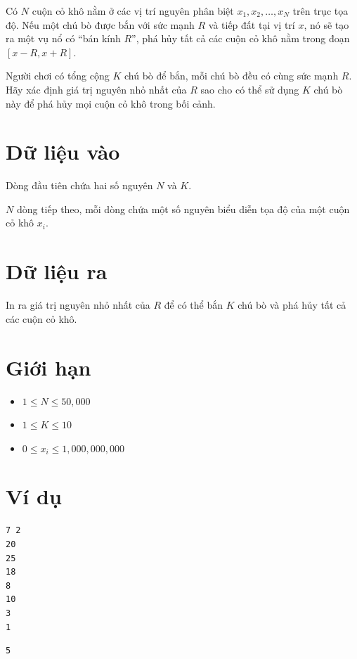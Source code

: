 \documentclass[12pt,a4paper]{article}
\begin{document}
Có $N$ cuộn cỏ khô nằm ở các vị trí nguyên phân biệt $x_1, x_2, \dots, x_N$ trên trục tọa độ. Nếu một chú bò được bắn với sức mạnh $R$ và tiếp đất tại vị trí $x$, nó sẽ tạo ra một vụ nổ có ``bán kính $R$'', phá hủy tất cả các cuộn cỏ khô nằm trong đoạn $[x-R, x+R]$.

Người chơi có tổng cộng $K$ chú bò để bắn, mỗi chú bò đều có cùng sức mạnh $R$. Hãy xác định giá trị nguyên nhỏ nhất của $R$ sao cho có thể sử dụng $K$ chú bò này để phá hủy mọi cuộn cỏ khô trong bối cảnh.

\section*{Dữ liệu vào}
Dòng đầu tiên chứa hai số nguyên $N$ và $K$.

$N$ dòng tiếp theo, mỗi dòng chứa một số nguyên biểu diễn tọa độ của một cuộn cỏ khô $x_i$.

\section*{Dữ liệu ra}
In ra giá trị nguyên nhỏ nhất của $R$ để có thể bắn $K$ chú bò và phá hủy tất cả các cuộn cỏ khô.

\section*{Giới hạn}
\begin{constraintbox}
\begin{itemize}
    \item $1 \le N \le 50,000$
    \item $1 \le K \le 10$
    \item $0 \le x_i \le 1,000,000,000$
\end{itemize}
\end{constraintbox}

\section*{Ví dụ}
\begin{inputbox}
\begin{lstlisting}
7 2
20
25
18
8
10
3
1
\end{lstlisting}
\end{inputbox}

\begin{outputbox}
\begin{lstlisting}
5
\end{lstlisting}
\end{outputbox}
\end{document}

